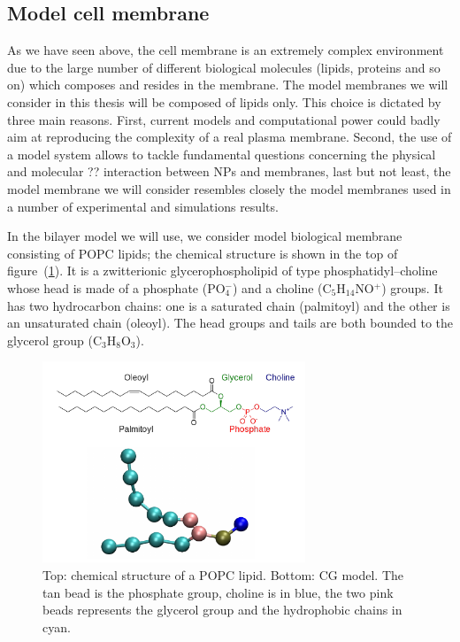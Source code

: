 \subsection{Model cell membrane}
As we have seen above, the cell membrane is an extremely complex environment due to the large number of different biological molecules (lipids, proteins and so on) which composes and resides in the membrane. The model membranes we will consider in this thesis will be composed of lipids only. This choice is dictated by three main reasons. First, current models and computational power could badly aim at reproducing the complexity of a real plasma membrane. Second, the use of a model system allows to tackle fundamental questions concerning the physical and molecular  ?? interaction between \acp{NP} and membranes, last but not least, the model membrane we will consider resembles closely the model membranes used in a number of experimental and simulations results.  

In the bilayer model we will use, we consider model biological membrane consisting of \ac{POPC} lipids; the 
chemical structure is shown in the top of figure~(\ref{fig:popc}). It is a zwitterionic glycerophospholipid of 
type phosphatidyl--choline whose head is made of a phosphate (PO$_4^-$) and a choline (C$_5$H$_{14}$NO$^+$) 
groups. It has two hydrocarbon chains: one is a saturated chain (palmitoyl) and the other is an unsaturated chain 
(oleoyl). The head groups and tails are both bounded to the glycerol group (C$_3$H$_8$O$_3$).
\begin{figure}[!ht]
	\centering
	\includegraphics[width=0.7\textwidth]{./img/POPC/popc}
	\caption{Top: chemical structure of a \acs{POPC} lipid. Bottom: \martini \acs{CG} model. The tan bead is the phosphate group, choline is in blue, the two pink beads represents the glycerol group and the hydrophobic chains in cyan.}
	\label{fig:popc}
\end{figure}

